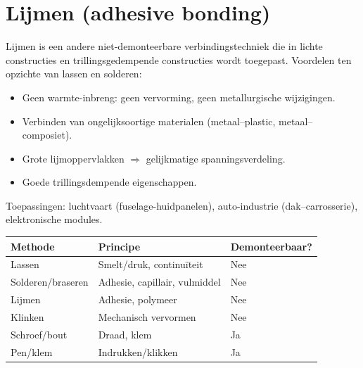 \section{Lijmen (adhesive bonding)}

Lijmen is een andere niet-demonteerbare verbindingstechniek die in lichte constructies en
trillingsgedempende constructies wordt toegepast.  Voordelen ten opzichte van lassen en
solderen:
\begin{itemize}
  \item Geen warmte-inbreng: geen vervorming, geen metallurgische wijzigingen.
  \item Verbinden van ongelijksoortige materialen (metaal--plastic, metaal--composiet).
  \item Grote lijmoppervlakken $\Rightarrow$ gelijkmatige spanningsverdeling.
  \item Goede trillingsdempende eigenschappen.
\end{itemize}

Toepassingen: luchtvaart (fuselage-huidpanelen), auto-industrie (dak--carrosserie),
elektronische modules.

\begin{conceptbox}
\begin{center}
\begin{tabular}{lll}
\hline
\textbf{Methode} & \textbf{Principe} & \textbf{Demonteerbaar?} \\
\hline
Lassen & Smelt/druk, continuïteit & Nee \\
Solderen/braseren & Adhesie, capillair, vulmiddel & Nee \\
Lijmen & Adhesie, polymeer & Nee \\
Klinken & Mechanisch vervormen & Nee \\
Schroef/bout & Draad, klem & Ja \\
Pen/klem & Indrukken/klikken & Ja \\
\hline
\end{tabular}
\end{center}
\end{conceptbox}
